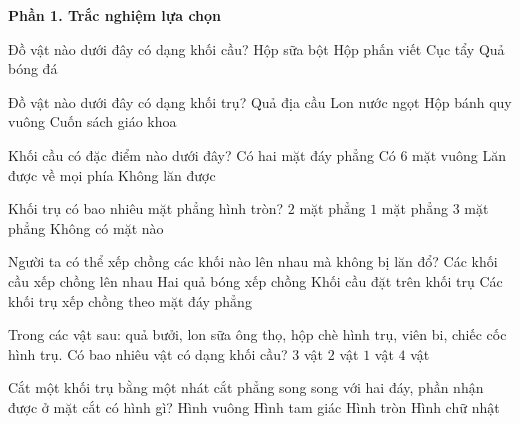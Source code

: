 \textbf{Phần 1. Trắc nghiệm lựa chọn}

\begin{ex} %
Đồ vật nào dưới đây có dạng khối cầu?
\choice
{Hộp sữa bột}
{Hộp phấn viết}
{Cục tẩy}
{\True Quả bóng đá}
\end{ex}

\begin{ex} %
Đồ vật nào dưới đây có dạng khối trụ?
\choice
{Quả địa cầu}
{\True Lon nước ngọt}
{Hộp bánh quy vuông}
{Cuốn sách giáo khoa}
\end{ex}

\begin{ex} %
Khối cầu có đặc điểm nào dưới đây?
\choice
{Có hai mặt đáy phẳng}
{Có $6$ mặt vuông}
{\True Lăn được về mọi phía}
{Không lăn được}
\end{ex}

\begin{ex} %
Khối trụ có bao nhiêu mặt phẳng hình tròn?
\choice
{\True $2$ mặt phẳng}
{$1$ mặt phẳng}
{$3$ mặt phẳng}
{Không có mặt nào}
\end{ex}

\begin{ex} %
Người ta có thể xếp chồng các khối nào lên nhau mà không bị lăn đổ?
\choice
{Các khối cầu xếp chồng lên nhau}
{Hai quả bóng xếp chồng}
{Khối cầu đặt trên khối trụ}
{\True Các khối trụ xếp chồng theo mặt đáy phẳng}
\end{ex}

\begin{ex} %
Trong các vật sau: quả bưởi, lon sữa ông thọ, hộp chè hình trụ, viên bi, chiếc cốc hình trụ. Có bao nhiêu vật có dạng khối cầu?
\choice
{$3$ vật}
{\True $2$ vật}
{$1$ vật}
{$4$ vật}
\end{ex}

\begin{ex} %
Cắt một khối trụ bằng một nhát cắt phẳng song song với hai đáy, phần nhận được ở mặt cắt có hình gì?
\choice
{Hình vuông}
{Hình tam giác}
{\True Hình tròn}
{Hình chữ nhật}
\end{ex}

